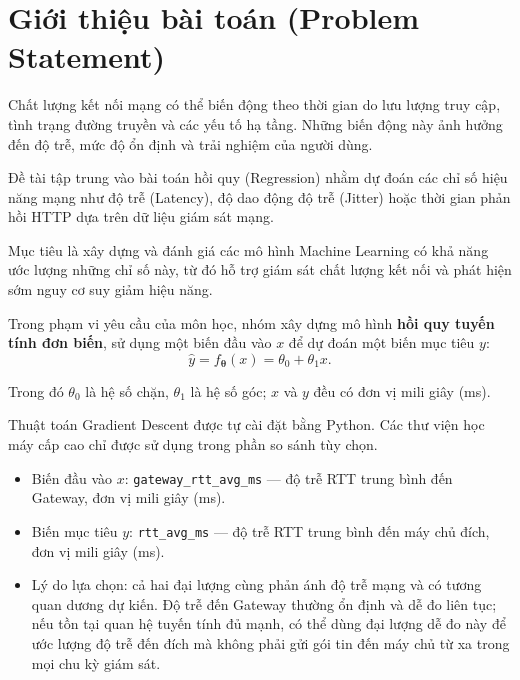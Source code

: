 \section{Giới thiệu bài toán (Problem Statement)}

Chất lượng kết nối mạng có thể biến động theo thời gian do
lưu lượng truy cập, tình trạng đường truyền và các yếu tố
hạ tầng. Những biến động này ảnh hưởng đến độ trễ, mức độ
ổn định và trải nghiệm của người dùng.

Đề tài tập trung vào bài toán hồi quy (Regression) nhằm
dự đoán các chỉ số hiệu năng mạng như độ trễ (Latency),
độ dao động độ trễ (Jitter) hoặc thời gian phản hồi HTTP
dựa trên dữ liệu giám sát mạng.

Mục tiêu là xây dựng và đánh giá các mô hình Machine Learning
có khả năng ước lượng những chỉ số này, từ đó hỗ trợ giám sát
chất lượng kết nối và phát hiện sớm nguy cơ suy giảm hiệu năng.

Trong phạm vi yêu cầu của môn học, nhóm xây dựng mô hình
\textbf{hồi quy tuyến tính đơn biến}, sử dụng một biến đầu vào
$x$ để dự đoán một biến mục tiêu $y$:
\[
    \hat{y} = f_{\boldsymbol{\theta}}(x)
    = \theta_0 + \theta_1 x.
\]

Trong đó $\theta_0$ là hệ số chặn,
$\theta_1$ là hệ số góc; $x$ và $y$
đều có đơn vị mili giây (ms).

Thuật toán Gradient Descent được tự cài đặt bằng Python.
Các thư viện học máy cấp cao chỉ được sử dụng trong phần
so sánh tùy chọn.

\begin{itemize}
    \item Biến đầu vào $x$:
    \texttt{gateway\_rtt\_avg\_ms} --- độ trễ RTT trung bình
    đến Gateway, đơn vị mili giây (ms).
    \item Biến mục tiêu $y$:
    \texttt{rtt\_avg\_ms} --- độ trễ RTT trung bình đến
    máy chủ đích, đơn vị mili giây (ms).
    \item Lý do lựa chọn:
    cả hai đại lượng cùng phản ánh độ trễ mạng và có tương
    quan dương dự kiến. Độ trễ đến Gateway thường ổn định
    và dễ đo liên tục; nếu tồn tại quan hệ tuyến tính đủ
    mạnh, có thể dùng đại lượng dễ đo này để ước lượng độ
    trễ đến đích mà không phải gửi gói tin đến máy chủ từ
    xa trong mọi chu kỳ giám sát.
\end{itemize}
